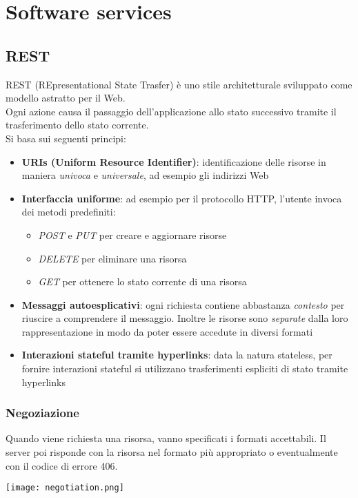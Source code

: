 \newpage
\section{Software services}
\subsection{REST}
REST (REpresentational State Trasfer) è uno stile architetturale sviluppato come modello astratto per il Web.\\
Ogni azione causa il passaggio dell'applicazione allo stato successivo tramite il trasferimento dello stato corrente.\\
Si basa sui seguenti principi:
\begin{itemize}
	\item \textbf{URIs (Uniform Resource Identifier)}: identificazione delle risorse in maniera \textit{univoca} e \textit{universale}, ad esempio gli indirizzi Web
	\item \textbf{Interfaccia uniforme}: ad esempio per il protocollo HTTP, l'utente invoca dei metodi predefiniti:
	\begin{itemize}
		\item \textit{POST} e \textit{PUT} per creare e aggiornare risorse
		\item \textit{DELETE} per eliminare una risorsa
		\item \textit{GET} per ottenere lo stato corrente di una risorsa
	\end{itemize}
	\item \textbf{Messaggi autoesplicativi}: ogni richiesta contiene abbastanza \textit{contesto} per riuscire a comprendere il messaggio. Inoltre le risorse sono \textit{separate} dalla loro rappresentazione in modo da poter essere accedute in diversi formati
	\item \textbf{Interazioni stateful tramite hyperlinks}: data la natura stateless, per fornire interazioni stateful si utilizzano trasferimenti espliciti di stato tramite hyperlinks
\end{itemize}
\subsubsection{Negoziazione}
Quando viene richiesta una risorsa, vanno specificati i formati accettabili. Il server poi risponde con la risorsa nel formato più appropriato o eventualmente con il codice di errore 406.
\begin{center}
	\texttt{[image: negotiation.png]}
\end{center}
